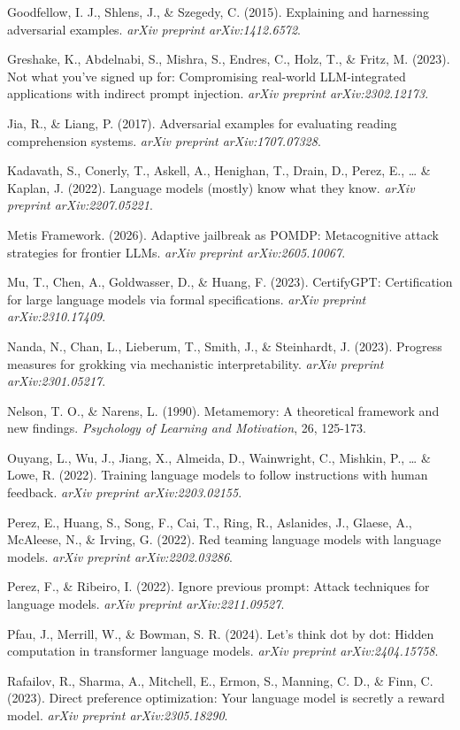 \documentclass[
  11pt,
]{article}
\begin{document}
Goodfellow, I. J., Shlens, J., \& Szegedy, C. (2015). Explaining and
harnessing adversarial examples. \emph{arXiv preprint arXiv:1412.6572}.

Greshake, K., Abdelnabi, S., Mishra, S., Endres, C., Holz, T., \& Fritz,
M. (2023). Not what you've signed up for: Compromising real-world
LLM-integrated applications with indirect prompt injection. \emph{arXiv
preprint arXiv:2302.12173}.

Jia, R., \& Liang, P. (2017). Adversarial examples for evaluating
reading comprehension systems. \emph{arXiv preprint arXiv:1707.07328}.

Kadavath, S., Conerly, T., Askell, A., Henighan, T., Drain, D., Perez,
E., \ldots{} \& Kaplan, J. (2022). Language models (mostly) know what
they know. \emph{arXiv preprint arXiv:2207.05221}.

Metis Framework. (2026). Adaptive jailbreak as POMDP: Metacognitive
attack strategies for frontier LLMs. \emph{arXiv preprint
arXiv:2605.10067}.

Mu, T., Chen, A., Goldwasser, D., \& Huang, F. (2023). CertifyGPT:
Certification for large language models via formal specifications.
\emph{arXiv preprint arXiv:2310.17409}.

Nanda, N., Chan, L., Lieberum, T., Smith, J., \& Steinhardt, J. (2023).
Progress measures for grokking via mechanistic interpretability.
\emph{arXiv preprint arXiv:2301.05217}.

Nelson, T. O., \& Narens, L. (1990). Metamemory: A theoretical framework
and new findings. \emph{Psychology of Learning and Motivation}, 26,
125-173.

Ouyang, L., Wu, J., Jiang, X., Almeida, D., Wainwright, C., Mishkin, P.,
\ldots{} \& Lowe, R. (2022). Training language models to follow
instructions with human feedback. \emph{arXiv preprint
arXiv:2203.02155}.

Perez, E., Huang, S., Song, F., Cai, T., Ring, R., Aslanides, J.,
Glaese, A., McAleese, N., \& Irving, G. (2022). Red teaming language
models with language models. \emph{arXiv preprint arXiv:2202.03286}.

Perez, F., \& Ribeiro, I. (2022). Ignore previous prompt: Attack
techniques for language models. \emph{arXiv preprint arXiv:2211.09527}.

Pfau, J., Merrill, W., \& Bowman, S. R. (2024). Let's think dot by dot:
Hidden computation in transformer language models. \emph{arXiv preprint
arXiv:2404.15758}.

Rafailov, R., Sharma, A., Mitchell, E., Ermon, S., Manning, C. D., \&
Finn, C. (2023). Direct preference optimization: Your language model is
secretly a reward model. \emph{arXiv preprint arXiv:2305.18290}.
\end{document}
